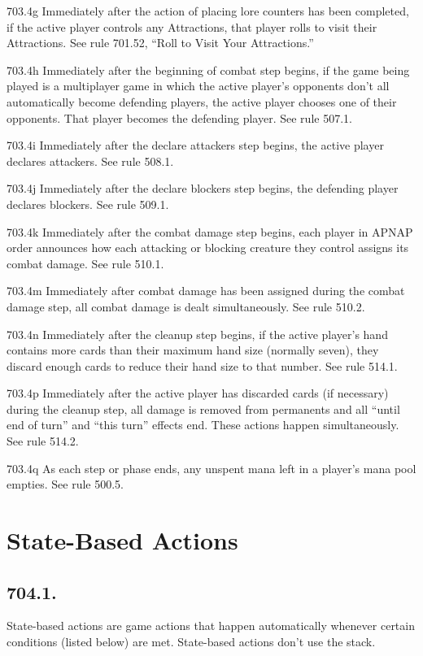 703.4g Immediately after the action of placing lore counters has been completed, if the active player controls any Attractions, that player rolls to visit their Attractions. See rule 701.52, “Roll to Visit Your Attractions.”

703.4h Immediately after the beginning of combat step begins, if the game being played is a multiplayer game in which the active player’s opponents don’t all automatically become defending players, the active player chooses one of their opponents. That player becomes the defending player. See rule 507.1.

703.4i Immediately after the declare attackers step begins, the active player declares attackers. See rule 508.1.

703.4j Immediately after the declare blockers step begins, the defending player declares blockers. See rule 509.1.

703.4k Immediately after the combat damage step begins, each player in APNAP order announces how each attacking or blocking creature they control assigns its combat damage. See rule 510.1.

703.4m Immediately after combat damage has been assigned during the combat damage step, all combat damage is dealt simultaneously. See rule 510.2.

703.4n Immediately after the cleanup step begins, if the active player’s hand contains more cards than their maximum hand size (normally seven), they discard enough cards to reduce their hand size to that number. See rule 514.1.

703.4p Immediately after the active player has discarded cards (if necessary) during the cleanup step, all damage is removed from permanents and all “until end of turn” and “this turn” effects end. These actions happen simultaneously. See rule 514.2.

703.4q As each step or phase ends, any unspent mana left in a player’s mana pool empties. See rule 500.5.

\section{State-Based Actions}
\subsection*{704.1.}
State-based actions are game actions that happen automatically whenever certain conditions (listed below) are met. State-based actions don’t use the stack.

